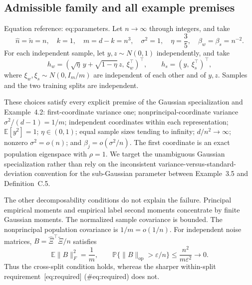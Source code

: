 \documentclass[10pt]{article}
\begin{document}
\subsection*{Admissible family and all example premises}
Equation reference: eq:parameters. Let \(n\to\infty\) through integers, and take \[
 \widehat n=\widetilde n=n,\quad k=1,\quad
 m=d-k=n^3,\quad \sigma^2=1,\quad
 \eta=\frac35,\quad \beta_w=\beta_s=n^{-2}.\] For each independent sample, let \(y,z\sim N(0,1)\) independently, and take \[h_w=(\sqrt\eta\,y+\sqrt{1-\eta}\,z,\ \xi_w^\top)^\top,
 \qquad h_s=(y,\ \xi_s^\top)^\top,\] where \(\xi_w,\xi_s\sim N(0,I_m/m)\) are independent of each other and of \(y,z\). Samples and the two training splits are independent.\par
These choices satisfy every explicit premise of the Gaussian specialization and Example 4.2: first-coordinate variance one; nonprincipal-coordinate variance \(\sigma^2/(d-1)=1/m\); independent coordinates within each representation; \(\mathbb E[y^2]=1\); \(\eta\in(0,1)\); equal sample sizes tending to infinity; \(d/n^2\to\infty\); nonzero \(\sigma^2=o(n)\); and \(\beta_j=o(\sigma^2/n)\). The first coordinate is an exact population eigenspace with \(\rho=1\). We target the unambiguous Gaussian specialization rather than rely on the inconsistent variance-versus-standard-deviation convention for the sub-Gaussian parameter between Example 3.5 and Definition C.5.\par
The other decomposability conditions do not explain the failure. Principal empirical moments and empirical label second moments concentrate by finite Gaussian moments. The normalized sample covariance is bounded. The nonprincipal population covariance is \(1/m=o(1/n)\). For independent noise matrices, \(B=\widehat\Xi^\top\widetilde\Xi/n\) satisfies \[\mathbb E\|B\|_F^2=\frac1m,\qquad
 \mathbb P\{\|B\|_{\mathrm{op}}>\varepsilon/n\}
 \le \frac{n^2}{m\varepsilon^2}\longrightarrow0.\] Thus the cross-split condition holds, whereas the sharper within-split requirement [eq:required] (\#eq:required) does not.\par
\end{document}
